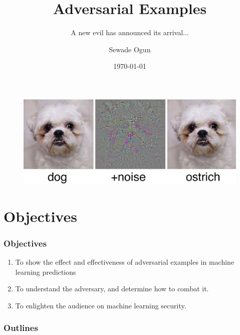 \documentclass[12pt]{beamer}
\begin{document}
	\addtocounter{framenumber}{-1}
	
	\author{Sewade Ogun}
	\title{Adversarial Examples}
	\subtitle{A new evil has announced its arrival...}
	\date{\today}
	\begin{frame}[plain]
	\maketitle
	\begin{figure}
		\centering
		\includegraphics[width=0.85\linewidth,height=0.4\textheight]{img/dog}
		\label{fig:dog}
	\end{figure}
\end{frame}

\section{Objectives}
\begin{frame}
\frametitle{Objectives}
\begin{enumerate}
	\item To show the effect and effectiveness of adversarial examples in machine learning predictions
	\item To understand the adversary, and determine how to combat it.
	\item To enlighten the audience on machine learning security.
\end{enumerate}

\end{frame}

\begin{frame}
	\frametitle{Outlines}
	\tableofcontents
\end{frame}
\end{document}

